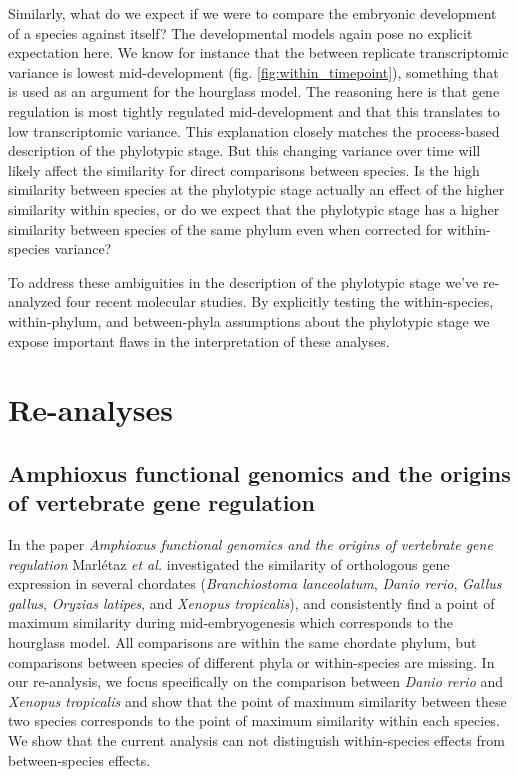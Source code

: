 Similarly, what do we expect if we were to compare the embryonic development of a species against itself? The developmental models again pose no explicit expectation here. We know for instance that the between replicate transcriptomic variance is lowest mid-development (fig. \ref{fig:within_timepoint}), something that is used as an argument for the hourglass model\cite{Liu2020, Uchida2022}. The reasoning here is that gene regulation is most tightly regulated mid-development and that this translates to low transcriptomic variance. This explanation closely matches the process-based description of the phylotypic stage. But this changing variance over time will likely affect the similarity for direct comparisons between species. Is the high similarity between species at the phylotypic stage actually an effect of the higher similarity within species, or do we expect that the phylotypic stage has a higher similarity between species of the same phylum even when corrected for within-species variance?

To address these ambiguities in the description of the phylotypic stage we've re-analyzed four recent molecular studies. By explicitly testing the within-species, within-phylum, and between-phyla  assumptions about the phylotypic stage we expose important flaws in the interpretation of these analyses.

\section{Re-analyses}

\subsection{Amphioxus functional genomics and the origins of vertebrate gene regulation} \label{subsection:marletaz}

In the paper \textit{Amphioxus functional genomics and the origins of vertebrate gene regulation}\cite{marletaz2018} Marl\'etaz \textit{et al.} investigated the similarity of orthologous gene expression in several chordates (\textit{Branchiostoma lanceolatum}, \textit{Danio rerio}, \textit{Gallus gallus}, \textit{Oryzias latipes}, and \textit{Xenopus tropicalis}), and consistently find a point of maximum similarity during mid-embryogenesis which corresponds to the hourglass model. All comparisons are within the same chordate phylum, but comparisons between species of different phyla or within-species are missing. In our re-analysis, we focus specifically on the comparison between \textit{Danio rerio} and \textit{Xenopus tropicalis} and show that the point of maximum similarity between these two species corresponds to the point of maximum similarity within each species. We show that the current analysis can not distinguish within-species effects from between-species effects.

